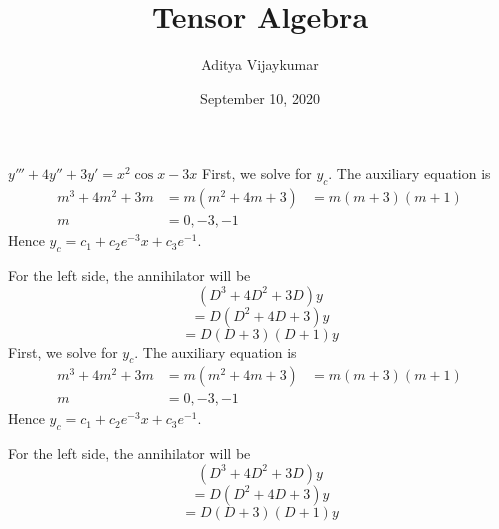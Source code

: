 \documentclass[landscape,aspectratio=169]{slides}
\title{Tensor Algebra}
\date{September 10, 2020}
\author{Aditya Vijaykumar}
\begin{document}
	
	\maketitle
	
	$y'''+4y''+3y'=x^2\cos x-3x$
	First, we solve for $y_c$. The auxiliary equation is 
	\begin{eqnarray*}
		m^3+4m^2+3m&=m(m^2+4m+3)
		&=m(m+3)(m+1)\\
		m&=0, -3, -1
	\end{eqnarray*}
	Hence $y_c=c_1+c_2e^{-3}x+c_3e^{-1}$.\par
	For the left side, the annihilator will be 
	$$(D^3+4D^2+3D)y$$ $$=D(D^2+4D+3)y$$
	$$=D(D+3)(D+1)y$$
	First, we solve for $y_c$. The auxiliary equation is 
	\begin{eqnarray*}
		m^3+4m^2+3m&=m(m^2+4m+3)
		&=m(m+3)(m+1)\\
		m&=0, -3, -1
	\end{eqnarray*}
	Hence $y_c=c_1+c_2e^{-3}x+c_3e^{-1}$.\par
	For the left side, the annihilator will be 
	$$(D^3+4D^2+3D)y$$ $$=D(D^2+4D+3)y$$
	$$=D(D+3)(D+1)y$$
\end{document}
